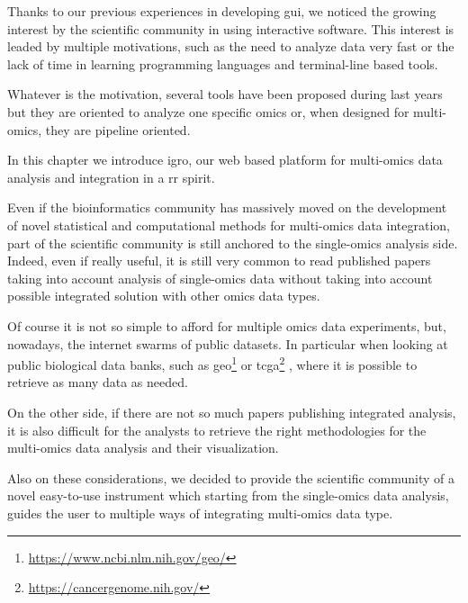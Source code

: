 Thanks to our previous experiences \cite{russo2015advantages} in developing \gls{gui}, we noticed the growing interest by the scientific community in using interactive software.
This interest is leaded by multiple motivations, such as the need to analyze data very fast or the lack of time in learning programming languages and terminal-line based tools.

Whatever is the motivation, several tools \cite{Poplawski2016} have been proposed during last years but they are oriented to analyze one specific omics or, when designed for multi-omics, they are pipeline oriented. 

In this chapter we introduce \gls{igro}, our web based platform for multi-omics data analysis and integration in a \gls{rr} spirit.



Even if the bioinformatics community has massively moved on the development of novel statistical and computational methods for multi-omics data integration, part of the scientific community is still anchored to the single-omics analysis side.
Indeed, even if really useful, it is still very common to read published papers taking into account analysis of single-omics data without taking into account possible integrated solution with other omics data types.

Of course it is not so simple to afford for multiple omics data experiments, but, nowadays, the internet swarms of public datasets.
In particular when looking at public biological data banks, such as \gls{geo}\footnote{\url{https://www.ncbi.nlm.nih.gov/geo/}} \cite{Services2007} or \gls{tcga}\footnote{\url{https://cancergenome.nih.gov/}} \cite{TheCancerGenomaAtlas2013a}, where it is possible to retrieve as many data as needed.

On the other side, if there are not so much papers publishing integrated analysis, it is also difficult for the analysts to retrieve the right methodologies for the multi-omics data analysis and their visualization. 

Also on these considerations, we decided to provide the scientific community of a novel easy-to-use instrument which starting from the single-omics data analysis, guides the user to multiple ways of integrating multi-omics data type.



